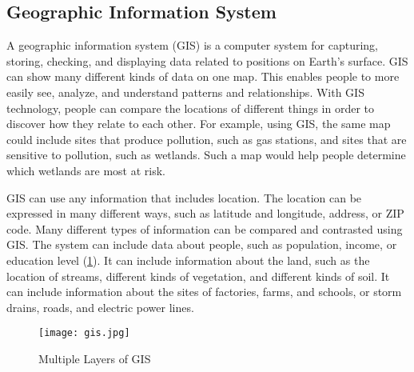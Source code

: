 \subsection{Geographic Information System}
A geographic information system (GIS) is a computer system for capturing, storing, checking, and displaying data related to positions on Earth’s surface\cite{DefiniGIS}. GIS can show many different kinds of data on one map. This enables people to more easily see, analyze, and understand patterns and relationships. With GIS technology, people can compare the locations of different things in order to discover how they relate to each other. For example, using GIS, the same map could include sites that produce pollution, such as gas stations, and sites that are sensitive to pollution, such as wetlands. Such a map would help people determine which wetlands are most at risk.\par 

GIS can use any information that includes location. The location can be expressed in many different ways, such as latitude and longitude, address, or ZIP code. Many different types of information can be compared and contrasted using GIS. The system can include data about people, such as population, income, or education level (\figurename{\ref{fig:DefinisiGIS}}). It can include information about the land, such as the location of streams, different kinds of vegetation, and different kinds of soil. It can include information about the sites of factories, farms, and schools, or storm drains, roads, and electric power lines.\par
\begin{figure}[H]
    \begin{center}
    \texttt{[image: gis.jpg]}
        \caption{Multiple Layers of GIS \cite{DefiniGIS}}
        \label{fig:DefinisiGIS}
    \end{center}
\end{figure}\par
\vspace{-1cm}
